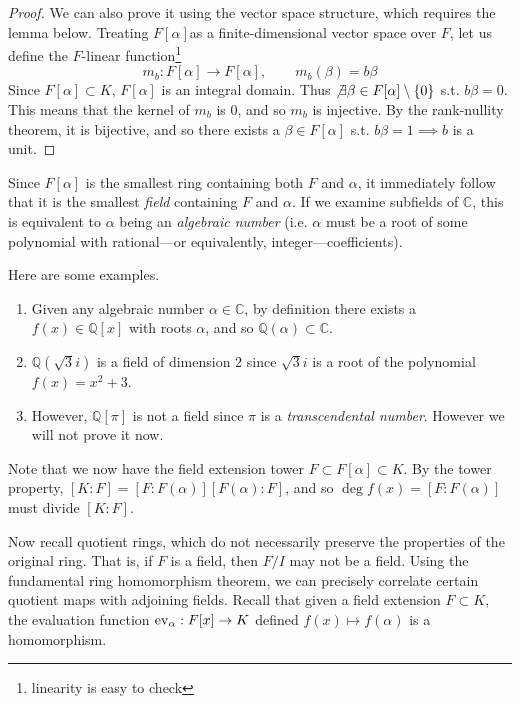   \begin{proof}
    We can also prove it using the vector space structure, which requires the lemma below. Treating $F[\alpha]$as a finite-dimensional vector space over $F$, let us define the $F$-linear function\footnote{linearity is easy to check}
    \begin{equation}
      m_b: F[\alpha] \rightarrow F[\alpha], \qquad m_b (\beta) = b\beta
    \end{equation} 
    Since $F[\alpha] \subset K$, $F[\alpha]$ is an integral domain. Thus $\not\exists \beta \in F[\alpha] \setminus \{0\}$ s.t. $b \beta = 0$. This means that the kernel of $m_b$ is $0$, and so $m_b$ is injective. By the rank-nullity theorem, it is bijective, and so there exists a $\beta \in F[\alpha]$ s.t. $b \beta = 1 \implies b$ is a unit. 
  \end{proof} 

  Since $F[\alpha]$ is the smallest ring containing both $F$ and $\alpha$, it immediately follow that it is the smallest \textit{field} containing $F$ and $\alpha$. If we examine subfields of $\mathbb{C}$, this is equivalent to $\alpha$ being an \textit{algebraic number} (i.e. $\alpha$ must be a root of some polynomial with rational---or equivalently, integer---coefficients). 

  \begin{example}
    Here are some examples. 
    \begin{enumerate}
      \item Given any algebraic number $\alpha \in \mathbb{C}$, by definition there exists a $f(x) \in \mathbb{Q}[x]$ with roots $\alpha$, and so $\mathbb{Q}(\alpha) \subset \mathbb{C}$. 
      \item $\mathbb{Q}(\sqrt{3} i)$ is a field of dimension 2 since $\sqrt{3}i$ is a root of the polynomial $f(x) = x^2 + 3$. 
      \item However, $\mathbb{Q}[\pi]$ is not a field since $\pi$ is a \textit{transcendental number}. However we will not prove it now. 
    \end{enumerate}
  \end{example}

  Note that we now have the field extension tower $F \subset F[\alpha] \subset K$. By the tower property, $[K:F] = [F:F(\alpha)] [F(\alpha):F]$, and so $\deg{f(x)} = [F:F(\alpha)]$  must divide $[K:F]$. 

  Now recall quotient rings, which do not necessarily preserve the properties of the original ring. That is, if $F$ is a field, then $F/I$ may not be a field. Using the fundamental ring homomorphism theorem, we can precisely correlate certain quotient maps with adjoining fields. Recall that given a field extension $F \subset K$, the evaluation function $\operatorname{ev}_\alpha: F[x] \rightarrow K$ defined $f(x) \mapsto f(\alpha)$ is a homomorphism. 

